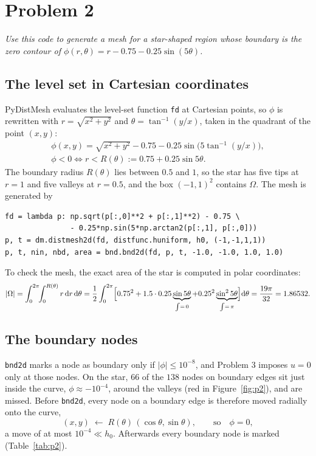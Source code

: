 \documentclass[11pt]{article}
\newcommand{\abs}[1]{\lvert #1\rvert}
\newcommand{\Om}{\Omega}
\newcommand{\problem}[2]{%
  \section*{Problem #1}%
  \renewcommand{\theequation}{#2.\arabic{equation}}%
  \setcounter{equation}{0}}
\begin{document}
 \newpage

\problem{2}{2}

\textit{Use this code to generate a mesh for a star-shaped region whose
boundary is the zero contour of $\phi(r,\theta)=r-0.75-0.25\sin(5\theta)$.}

\subsection*{The level set in Cartesian coordinates}

PyDistMesh evaluates the level-set function \texttt{fd} at Cartesian points,
so $\phi$ is rewritten with $r=\sqrt{x^{2}+y^{2}}$ and
$\theta=\tan^{-1}(y/x)$, taken in the quadrant of the point $(x,y)$:
\begin{equation}\label{eq:phi}
  \begin{gathered}
  \phi(x,y)=\sqrt{x^{2}+y^{2}}-0.75-0.25\sin\bigl(5\tan^{-1}(y/x)\bigr),\\
  \phi<0\iff r<R(\theta):=0.75+0.25\sin5\theta .
  \end{gathered}
\end{equation}
The boundary radius $R(\theta)$ lies between $0.5$ and $1$, so the star has
five tips at $r=1$ and five valleys at $r=0.5$, and the box $(-1,1)^{2}$
contains $\Om$.  The mesh is generated by
\begin{Verbatim}[fontsize=\small,xleftmargin=1em]
fd = lambda p: np.sqrt(p[:,0]**2 + p[:,1]**2) - 0.75 \
               - 0.25*np.sin(5*np.arctan2(p[:,1], p[:,0]))
p, t = dm.distmesh2d(fd, distfunc.huniform, h0, (-1,-1,1,1))
p, t, nin, nbd, area = bnd.bnd2d(fd, p, t, -1.0, -1.0, 1.0, 1.0)
\end{Verbatim}
To check the mesh, the exact area of the star is computed in polar
coordinates:
\begin{equation}\label{eq:area}
  \abs{\Om}=\int_{0}^{2\pi}\!\!\int_{0}^{R(\theta)}r\,\mathrm{d}r\,\mathrm{d}\theta
  =\frac12\int_{0}^{2\pi}\Bigl[0.75^{2}+1.5\cdot0.25\underbrace{\sin5\theta}_{\int=\,0}
   +0.25^{2}\underbrace{\sin^{2}5\theta}_{\int=\,\pi}\Bigr]\mathrm{d}\theta
  =\frac{19\pi}{32}=1.86532 .
\end{equation}

\subsection*{The boundary nodes}

\texttt{bnd2d} marks a node as boundary only if $\abs{\phi}\le10^{-8}$, and
Problem 3 imposes $u=0$ only at those nodes.  On the star, $66$ of the $138$
nodes on boundary edges sit just inside the curve, $\phi\approx-10^{-4}$,
around the valleys (red in Figure~\ref{fig:p2}), and are missed.  Before
\texttt{bnd2d}, every node on a boundary edge is therefore moved radially
onto the curve,
\begin{equation}\label{eq:snap}
  (x,y)\;\leftarrow\;R(\theta)\,(\cos\theta,\sin\theta),
  \qquad\text{so}\quad \phi=0 ,
\end{equation}
a move of at most $10^{-4}\ll h_{0}$.  Afterwards every boundary node is
marked (Table~\ref{tab:p2}).
\end{document}
